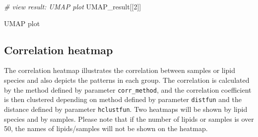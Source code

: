 \documentclass[]{article}
\newcommand{\hlnum}[1]{\textcolor[rgb]{0.816,0.125,0.439}{#1}}%
\newcommand{\hlcom}[1]{\textcolor[rgb]{0.502,0.502,0.502}{\textit{#1}}}%
\newcommand{\hlstd}[1]{\textcolor[rgb]{0.251,0.251,0.251}{#1}}%
\newenvironment{Shaded}{\begin{myshaded}}{\end{myshaded}}
\newcommand{\DecValTok}[1]{\hlnum{#1}}
\newcommand{\CommentTok}[1]{\hlcom{#1}}
\newcommand{\NormalTok}[1]{\hlstd{#1}}
\begin{document}
\begin{Shaded}
\begin{Highlighting}[]
\CommentTok{# view result: UMAP plot}
\NormalTok{UMAP_result[[}\DecValTok{2}\NormalTok{]]   }
\end{Highlighting}
\end{Shaded}

\label{fig:unnamed-chunk-12}UMAP plot

\hypertarget{correlation-heatmap}{%
\subsection{Correlation heatmap}\label{correlation-heatmap}}

The correlation heatmap illustrates the correlation between samples or lipid species and also depicts the patterns in each group. The correlation is calculated by the method defined by parameter \texttt{corr\_method}, and the correlation coefficient is then clustered depending on method defined by parameter \texttt{distfun} and the distance defined by parameter \texttt{hclustfun}. Two heatmaps will be shown by lipid species and by samples. Please note that if the number of lipids or samples is over 50, the names of lipids/samples will not be shown on the heatmap.
\end{document}
